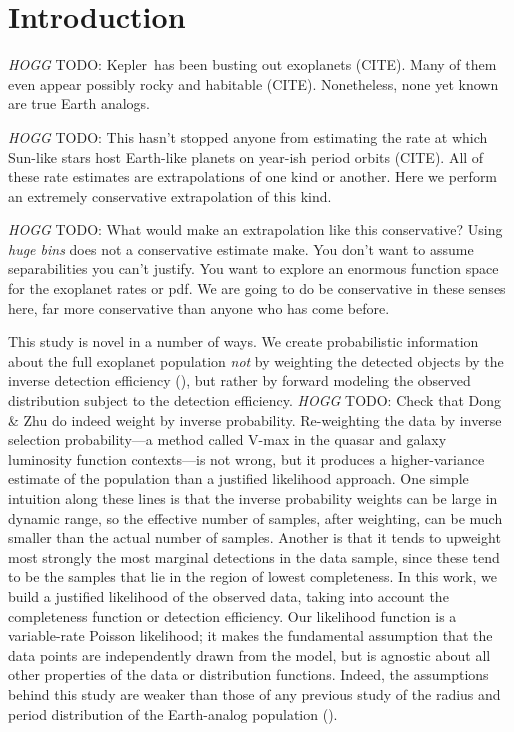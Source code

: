 \documentclass[12pt,preprint]{aastex}
\newcommand{\project}[1]{{\sffamily #1}}
\newcommand{\kepler}{\project{Kepler}}
\newcommand{\todo}[3]{{\color{#2} \emph{#1} TODO: #3}}
\newcommand{\hoggtodo}[1]{\todo{HOGG}{blue}{#1}}
\begin{document}

\section{Introduction}

\hoggtodo{
\kepler\ has been busting out exoplanets (CITE).
Many of them even appear possibly rocky and habitable (CITE).
Nonetheless, none yet known are true Earth analogs.
}

\hoggtodo{
This hasn't stopped anyone from estimating the rate at which Sun-like stars
host Earth-like planets on year-ish period orbits (CITE).
All of these rate estimates are extrapolations of one kind or another.
Here we perform an extremely conservative extrapolation of this kind.
}

\hoggtodo{
What would make an extrapolation like this conservative?
Using \emph{huge bins} does not a conservative estimate make.
You don't want to assume separabilities you can't justify.
You want to explore an enormous function space for the exoplanet rates or pdf.
We are going to do be conservative in these senses here, far more conservative
than anyone who has come before.
}

This study is novel in a number of ways.
We create probabilistic information about the full exoplanet population
\emph{not} by weighting the detected objects by the inverse detection
efficiency (\citealt{dong, petigura}), but rather by forward modeling the
observed distribution subject to the detection efficiency.
\hoggtodo{Check that Dong \& Zhu do indeed weight by inverse probability.}
Re-weighting the data by inverse selection probability---a method called
V-max in the quasar and galaxy luminosity function contexts---is not wrong,
but it produces a higher-variance estimate of the population than a justified
likelihood approach.
One simple intuition along these lines is that the inverse probability weights
can be large in dynamic range, so the effective number of samples, after
weighting, can be much smaller than the actual number of samples.
Another is that it tends to upweight most strongly the most marginal
detections in the data sample, since these tend to be the samples that lie in
the region of lowest completeness.  In this work, we build a justified
likelihood of the observed data, taking into account the completeness function
or detection efficiency.
Our likelihood function is a variable-rate Poisson likelihood; it makes the
fundamental assumption that the data points are independently drawn from the
model, but is agnostic about all other properties of the data or distribution
functions.
Indeed, the assumptions behind this study are weaker than those of any
previous study of the radius and period distribution of the Earth-analog
population (\citealt{dong, petigura}).
\end{document}
